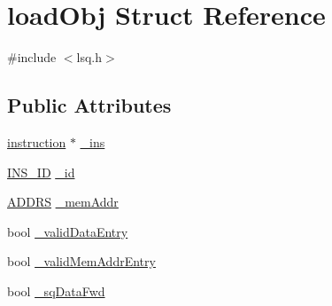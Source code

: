 \hypertarget{structloadObj}{
\section{loadObj Struct Reference}
\label{structloadObj}
}


{\ttfamily \#include $<$lsq.h$>$}

\subsection*{Public Attributes}
\begin{DoxyCompactItemize}
\item 
\hyperlink{classinstruction}{instruction} $\ast$ \hyperlink{structloadObj_ae32e4dcdfc8c2579dd13f4eaec948f4e}{\_\-ins}
\item 
\hyperlink{global_2global_8h_a1883c47d0023d0f200e1d86eced6a070}{INS\_\-ID} \hyperlink{structloadObj_a97df4b71c67011b6ee95425d2064f611}{\_\-id}
\item 
\hyperlink{global_2global_8h_a7ea74bb9ffd2e4d41550ae2383dd25bc}{ADDRS} \hyperlink{structloadObj_a3e67fd0b457d87133712c8e394751a0e}{\_\-memAddr}
\item 
bool \hyperlink{structloadObj_acd2c9ebea408592d102df591d4f9b595}{\_\-validDataEntry}
\item 
bool \hyperlink{structloadObj_aaf2d7a6675caaceff6e594f0686ccb82}{\_\-validMemAddrEntry}
\item 
bool \hyperlink{structloadObj_a013f319b3bb0148e9bd00d6742d54246}{\_\-sqDataFwd}
\end{DoxyCompactItemize}


